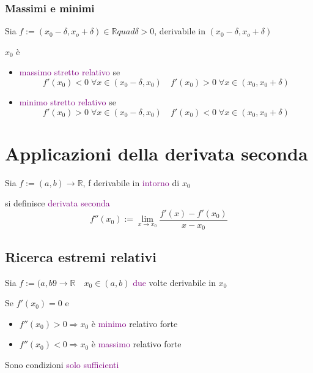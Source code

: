 \documentclass{article}
\begin{document}
\subsubsection{Massimi e minimi}

Sia $f:=(x_0 - \delta, x_o + \delta) \in \mathbb{R} quad \delta >0$, derivabile in $(x_0 - \delta, x_o + \delta) $

$x_0$ è 
\begin{itemize}
    \item \textcolor{purple}{massimo stretto relativo} se
    \[f'(x_0) < 0 \; \forall x \in (x_0 - \delta, x_0) \quad f'(x_0) > 0 \; \forall x \in (x_0, x_0 + \delta) \]
     \item \textcolor{purple}{minimo stretto relativo} se
    \[f'(x_0) > 0 \; \forall x \in (x_0 - \delta, x_0) \quad f'(x_0) < 0 \; \forall x \in (x_0, x_0 + \delta) \]
\end{itemize}


\section{Applicazioni della derivata seconda}

Sia $f:= (a,b)\to \mathbb{R}$, f derivabile in \textcolor{purple}{intorno} di $x_0$
\begin{tcolorbox}[colback = pink!10!white,   colframe=red!50!blue]
    si definisce \textcolor{purple}{derivata seconda}
    \[f''(x_0):= \lim_{x \to x_0} \frac{f'(x) -f'(x_0)}{x - x_0}\]
\end{tcolorbox}

\subsection{Ricerca estremi relativi}

Sia $f:=(a,b9 \to \mathbb{R} \quad x_0 \in (a,b)$ \textcolor{purple}{due} volte derivabile in $x_0$

Se $f'(x_0) = 0$ e

\begin{itemize}
    \item $f''(x_0)>0 \Rightarrow x_0$ è \textcolor{purple}{minimo} relativo forte
    \item $f''(x_0)<0 \Rightarrow x_0$ è \textcolor{purple}{massimo} relativo forte 
    
\end{itemize}

Sono condizioni \textcolor{purple}{solo sufficienti}
\end{document}
